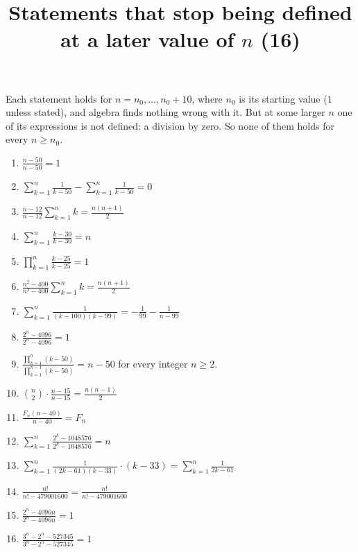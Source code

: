 \documentclass[11pt,a4paper]{article}
\title{Statements that stop being defined at a later value of $n$ (16)}
\author{}
\date{}
\begin{document}
\maketitle
Each statement holds for $n = n_0, \ldots, n_0 + 10$, where $n_0$ is its starting value ($1$ unless stated), and algebra finds nothing wrong with it. But at some larger $n$ one of its expressions is not defined: a division by zero. So none of them holds for every $n \ge n_0$.

\begin{enumerate}
\item $\displaystyle \frac{n - 50}{n - 50} = 1$
\item $\displaystyle \sum_{k=1}^{n} \frac{1}{k - 50} - \sum_{k=1}^{n} \frac{1}{k - 50} = 0$
\item $\displaystyle \frac{n - 12}{n - 12} \sum_{k=1}^{n} k = \frac{n\left(n + 1\right)}{2}$
\item $\displaystyle \sum_{k=1}^{n} \frac{k - 30}{k - 30} = n$
\item $\displaystyle \prod_{k=1}^{n} \frac{k - 25}{k - 25} = 1$
\item $\displaystyle \frac{n^{2} - 400}{n^{2} - 400} \sum_{k=1}^{n} k = \frac{n\left(n + 1\right)}{2}$
\item $\displaystyle \sum_{k=1}^{n} \frac{1}{\left(k - 100\right)\left(k - 99\right)} = -\frac{1}{99} - \frac{1}{n - 99}$
\item $\displaystyle \frac{2^{n} - 4096}{2^{n} - 4096} = 1$
\item $\displaystyle \frac{\prod_{k=1}^{n} \left(k - 50\right)}{\prod_{k=1}^{n - 1} \left(k - 50\right)} = n - 50$ for every integer $n\ge 2$.
\item $\displaystyle \binom{n}{2} \cdot \frac{n - 15}{n - 15} = \frac{n\left(n - 1\right)}{2}$
\item $\displaystyle \frac{F_{n} \left(n - 40\right)}{n - 40} = F_{n}$
\item $\displaystyle \sum_{k=1}^{n} \frac{2^{k} - 1048576}{2^{k} - 1048576} = n$
\item $\displaystyle \sum_{k=1}^{n} \frac{1}{\left(2k - 61\right)\left(k - 33\right)} \cdot \left(k - 33\right) = \sum_{k=1}^{n} \frac{1}{2k - 61}$
\item $\displaystyle \frac{n!}{n! - 479001600} = \frac{n!}{n! - 479001600}$
\item $\displaystyle \frac{2^{n} - 4096 n}{2^{n} - 4096 n} = 1$
\item $\displaystyle \frac{3^{n} - 2^{n} - 527345}{3^{n} - 2^{n} - 527345} = 1$
\end{enumerate}
\end{document}
